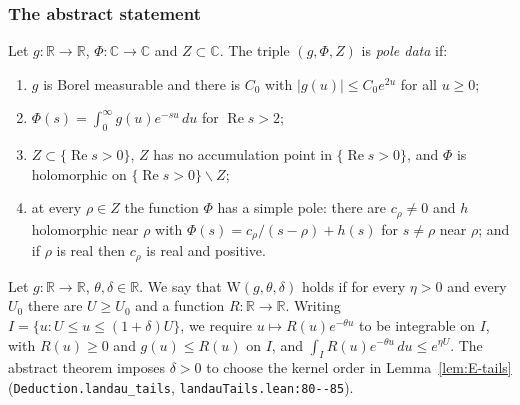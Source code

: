 
\subsubsection{The abstract statement}

\begin{definition}\label{def:E-poledata}

\par{}\par
Let $g:\mathbb R\to\mathbb R$, $\Phi:\mathbb C\to\mathbb C$ and $Z\subset\mathbb C$. The triple
$(g,\Phi,Z)$ is \emph{pole data} if:
\begin{enumerate}
\item[(P1)] $g$ is Borel measurable and there is $C_0$ with $|g(u)|\le C_0e^{2u}$ for all $u\ge0$;
\item[(P2)] $\Phi(s)=\int_0^\infty g(u)e^{-su}\,du$ for $\operatorname{Re}s>2$;
\item[(P3)] $Z\subset\{\operatorname{Re}s>0\}$, $Z$ has no accumulation point in
$\{\operatorname{Re}s>0\}$, and $\Phi$ is holomorphic on $\{\operatorname{Re}s>0\}\smallsetminus Z$;
\item[(P4)] at every $\rho\in Z$ the function $\Phi$ has a simple pole: there are $c_\rho\neq0$ and
$h$ holomorphic near $\rho$ with $\Phi(s)=c_\rho/(s-\rho)+h(s)$ for $s\neq\rho$ near $\rho$; and if
$\rho$ is real then $c_\rho$ is real and positive.
\end{enumerate}
\end{definition}

\begin{definition}\label{def:E-windowU}

\par{}\par
Let $g:\mathbb R\to\mathbb R$, $\theta,\delta\in\mathbb R$. We say that
$\mathrm{W}(g,\theta,\delta)$ holds if for every $\eta>0$ and every $U_0$ there are $U\ge U_0$ and a
function $R:\mathbb R\to\mathbb R$. Writing $I=\{u:U\le u\le(1+\delta)U\}$, we require
$u\mapsto R(u)e^{-\theta u}$ to be integrable on $I$, with $R(u)\ge0$ and $g(u)\le R(u)$
on $I$, and $\int_I R(u)e^{-\theta u}\,du\le e^{\eta U}$.
The abstract theorem imposes $\delta>0$ to choose the kernel order in Lemma~\ref{lem:E-tails}
(\texttt{Deduction.landau\_tails}, \nolinkurl{landauTails.lean:80--85}).
\end{definition}

